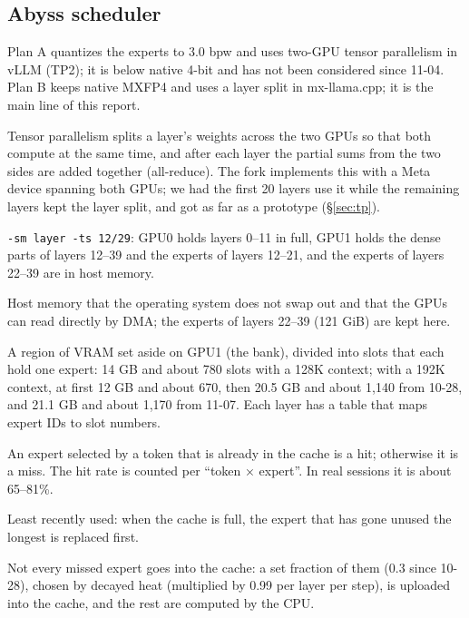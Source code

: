 \documentclass[11pt,a4paper]{article}
\newcommand{\code}[1]{\texttt{#1}}
\begin{document}
\subsection*{Abyss scheduler}
\begin{description}\small
  \item[Plan A, Plan B] Plan A quantizes the experts to 3.0 bpw and uses two-GPU tensor parallelism in vLLM (TP2); it is below native 4-bit and has not been considered since 11-04. Plan B keeps native MXFP4 and uses a layer split in mx-llama.cpp; it is the main line of this report.
  \item[Tensor parallelism, Meta device, all-reduce] Tensor parallelism splits a layer's weights across the two GPUs so that both compute at the same time, and after each layer the partial sums from the two sides are added together (all-reduce). The fork implements this with a Meta device spanning both GPUs; we had the first 20 layers use it while the remaining layers kept the layer split, and got as far as a prototype (\S\ref{sec:tp}).
  \item[Layer split] \code{-sm layer -ts 12/29}: GPU0 holds layers 0--11 in full, GPU1 holds the dense parts of layers 12--39 and the experts of layers 12--21, and the experts of layers 22--39 are in host memory.
  \item[Pinned host memory (CUDA\_Host)] Host memory that the operating system does not swap out and that the GPUs can read directly by DMA; the experts of layers 22--39 (121 GiB) are kept here.
  \item[Expert cache, bank, slot] A region of VRAM set aside on GPU1 (the bank), divided into slots that each hold one expert: 14 GB and about 780 slots with a 128K context; with a 192K context, at first 12 GB and about 670, then 20.5 GB and about 1,140 from 10-28, and 21.1 GB and about 1,170 from 11-07. Each layer has a table that maps expert IDs to slot numbers.
  \item[Hit, miss, hit rate] An expert selected by a token that is already in the cache is a hit; otherwise it is a miss. The hit rate is counted per ``token × expert''. In real sessions it is about 65--81\%.
  \item[LRU] Least recently used: when the cache is full, the expert that has gone unused the longest is replaced first.
  \item[Admission, heat] Not every missed expert goes into the cache: a set fraction of them (0.3 since 10-28), chosen by decayed heat (multiplied by 0.99 per layer per step), is uploaded into the cache, and the rest are computed by the CPU.

\end{description}
\end{document}

